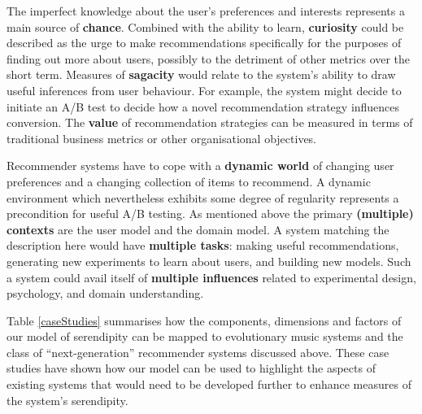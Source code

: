 The imperfect knowledge about the user's preferences and interests represents a main source of \textbf{chance}. Combined with the ability to learn, \textbf{curiosity} could be described as the urge to make recommendations specifically for the purposes of finding out more about users, possibly to the detriment of other metrics over the short term. Measures of \textbf{sagacity} would relate to the system's ability to draw useful inferences from user behaviour.  For example, the system might decide to initiate an A/B test to decide how a novel recommendation strategy influences conversion.  The \textbf{value} of recommendation strategies can be measured in terms of traditional business metrics or other organisational objectives.

Recommender systems have to cope with a \textbf{dynamic world} of changing user preferences and a changing collection of items to recommend.  A dynamic environment which nevertheless exhibits some degree of regularity represents a precondition for useful A/B testing.  As mentioned above the primary \textbf{(multiple) contexts} are the user model and the domain model. A system matching the description here would have \textbf{multiple tasks}: making useful recommendations, generating new experiments to learn about users, and building new models. Such a system could avail itself of \textbf{multiple influences} related to
experimental design, psychology, and domain understanding.

\medskip

Table \ref{caseStudies} summarises how the components, dimensions and
factors of our model of serendipity can be mapped to evolutionary
music systems and the class of ``next-generation'' recommender systems
discussed above.  These case studies have shown how our model can be
used to highlight the aspects of existing systems that would need to
be developed further to enhance measures of the system's serendipity.






